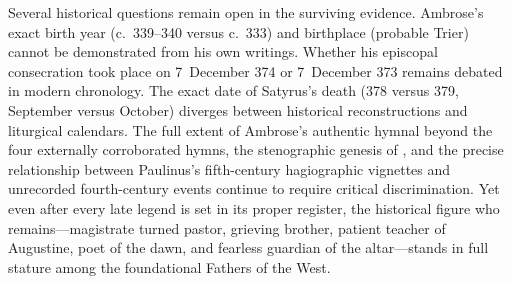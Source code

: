Several historical questions remain open in the surviving evidence. Ambrose's exact birth year (c.~339--340 versus c.~333) and birthplace (probable Trier) cannot be demonstrated from his own writings. Whether his episcopal consecration took place on 7~December 374 or 7~December 373 remains debated in modern chronology. The exact date of Satyrus's death (378 versus 379, September versus October) diverges between historical reconstructions and liturgical calendars. The full extent of Ambrose's authentic hymnal beyond the four externally corroborated hymns, the stenographic genesis of , and the precise relationship between Paulinus's fifth-century hagiographic vignettes and unrecorded fourth-century events continue to require critical discrimination. Yet even after every late legend is set in its proper register, the historical figure who remains---magistrate turned pastor, grieving brother, patient teacher of Augustine, poet of the dawn, and fearless guardian of the altar---stands in full stature among the foundational Fathers of the West.
